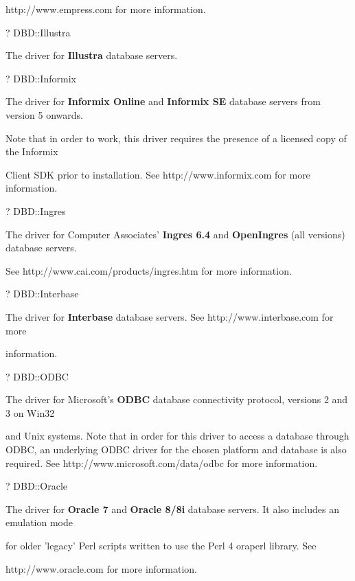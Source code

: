 \documentclass[a4paper,11pt]{book}
\begin{document}
\noindent http://www.empress.com for more information.

\noindent 

\noindent ? DBD::Illustra

\noindent The driver for \textbf{Illustra }database servers.

\noindent 

\noindent ? DBD::Informix

\noindent The driver for \textbf{Informix Online }and \textbf{Informix SE }database servers from version 5 onwards.

\noindent Note that in order to work, this driver requires the presence of a licensed copy of the Informix

\noindent Client SDK prior to installation. See http://www.informix.com for more information.

\noindent 

\noindent ? DBD::Ingres

\noindent The driver for Computer Associates' \textbf{Ingres 6.4 }and \textbf{OpenIngres }(all versions) database servers.

\noindent See http://www.cai.com/products/ingres.htm for more information.

\noindent 

\noindent ? DBD::Interbase

\noindent The driver for \textbf{Interbase  }database  servers.  See  http://www.interbase.com  for  more

\noindent information.

\noindent 

\noindent ? DBD::ODBC

\noindent The driver for Microsoft's \textbf{ODBC }database connectivity protocol, versions 2 and 3 on Win32

\noindent and Unix systems. Note that in order for this driver to access a database through ODBC, an underlying ODBC driver for the chosen platform and database is also required. See http://www.microsoft.com/data/odbc for more information.

\noindent ? DBD::Oracle

\noindent The driver for \textbf{Oracle 7 }and \textbf{Oracle 8/8i }database servers. It also includes an emulation mode

\noindent for older 'legacy' Perl scripts written to use the Perl 4 oraperl library. See

\noindent http://www.oracle.com for more information.
\end{document}
